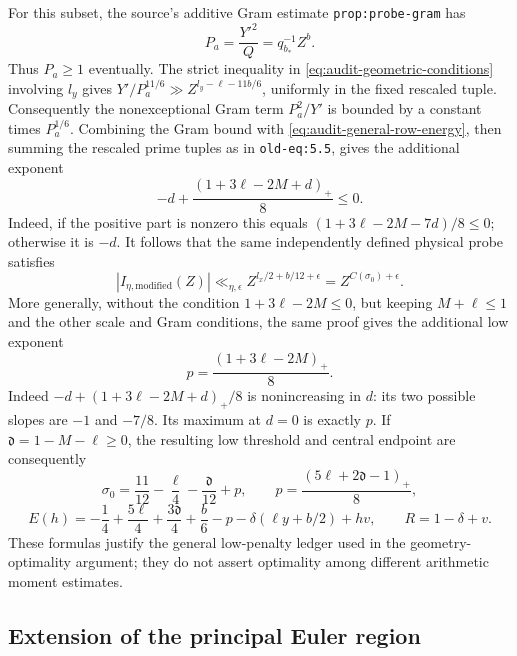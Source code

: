 \documentclass[11pt,a4paper]{article}
\numberwithin{equation}{section}
\theoremstyle{remark}
\begin{document}
For this subset, the source's additive Gram estimate
\texttt{prop:probe-gram} has
\[
 P_a=\frac{Y'^2}{Q}=q_{b_*}^{-1}Z^b.
\]
Thus \(P_a\ge1\) eventually.  The strict inequality in
\eqref{eq:audit-geometric-conditions} involving \(l_y\) gives
\(Y'/P_a^{11/6}\gg Z^{l_y-\ell-11b/6}\), uniformly in the fixed
rescaled tuple.  Consequently the nonexceptional Gram term
\(P_a^2/Y'\) is bounded by a constant times \(P_a^{1/6}\).
Combining the Gram bound with \eqref{eq:audit-general-row-energy}, then
summing the rescaled prime tuples as in \texttt{old-eq:5.5}, gives
the additional exponent
\[
 -d+\frac{(1+3\ell-2M+d)_+}{8}\le0.
\]
Indeed, if the positive part is nonzero this equals
\((1+3\ell-2M-7d)/8\le0\); otherwise it is \(-d\).
It follows that the same independently defined physical probe satisfies
\begin{equation}
 |I_{\eta,\mathrm{modified}}(Z)|
 \ll_{\eta,\epsilon}Z^{l_x/2+b/12+\epsilon}
 =Z^{C(\sigma_0)+\epsilon}.
 \label{eq:audit-low}
\end{equation}
More generally, without the condition \(1+3\ell-2M\le0\), but keeping
\(M+\ell\le1\) and the other scale and Gram conditions, the same proof
gives the additional low exponent
\[
 p=\frac{(1+3\ell-2M)_+}{8}.
\]
Indeed \(-d+(1+3\ell-2M+d)_+/8\) is nonincreasing in \(d\): its
two possible slopes are \(-1\) and \(-7/8\).  Its maximum at \(d=0\)
is exactly \(p\).  If \(\mathfrak d=1-M-\ell\ge0\), the resulting
low threshold and central endpoint are consequently
\[
 \sigma_0=\frac{11}{12}-\frac\ell4-\frac{\mathfrak d}{12}+p,
 \qquad p=\frac{(5\ell+2\mathfrak d-1)_+}{8},
\]
\[
 E(h)=-\frac14+\frac{5\ell}{4}+\frac{3\mathfrak d}{4}
       +\frac b6-p-\delta(\ell y+b/2)+h v,
 \qquad R=1-\delta+v.
\]
These formulas justify the general low-penalty ledger used in the
geometry-optimality argument; they do not assert optimality among
different arithmetic moment estimates.

\subsection{Extension of the principal Euler region}
\end{document}
